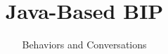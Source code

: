 \subtitle{Behaviors and Conversations}
\title[Java-Based BIP]{Java-Based BIP}
\author[]{}
 \institute[]{}
\date[]{}


\begin{frame}
 \maketitle
\end{frame}